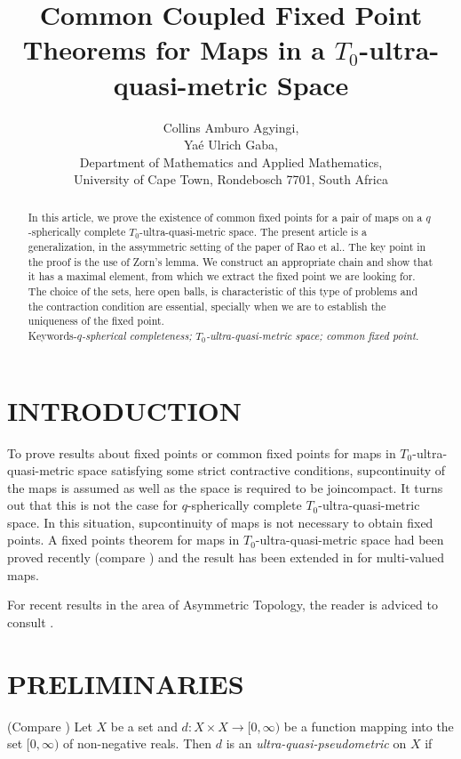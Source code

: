 \documentclass[10pt,a4paper]{article}
\title{Common Coupled Fixed Point Theorems for Maps in a $T_0$-ultra-quasi-metric Space}
\author{  Collins Amburo Agyingi,  \\ Ya\'e Ulrich Gaba,  \\ Department of Mathematics and Applied Mathematics,\\
University of Cape Town, Rondebosch 7701, South Africa}
\begin{document}
\maketitle


\begin{abstract}
In this article, we prove the existence of common fixed points for a pair of maps on a $q$-spherically complete $T_0$-ultra-quasi-metric space. The present article is a generalization, in the assymmetric setting of the paper of Rao et al.\cite{Rao}. The key point in the proof is the use of Zorn's lemma. We construct an appropriate chain and show that it has a maximal element, from which we extract the fixed point we are looking for. The choice of the sets, here open balls, is characteristic of this type of problems and the contraction condition are essential, specially when we are to establish the uniqueness of the fixed point. \\
Keywords-\textit{$q$-spherical completeness; $T_0$-ultra-quasi-metric space; common fixed point.}
\end{abstract}


\section{\textsc{INTRODUCTION}}
To prove results about fixed points or common fixed points for maps in $T_0$-ultra-quasi-metric space satisfying some strict contractive conditions, supcontinuity of the maps is assumed as well as the space is required to be joincompact. It turns out that this is not the case for $q$-spherically complete $T_0$-ultra-quasi-metric space. In this situation, supcontinuity of maps is not necessary to obtain fixed points. A fixed points theorem for maps in $T_0$-ultra-quasi-metric space had been proved recently (compare \cite{Agyingifixed}) and the result has been extended in \cite{Agyingiproximity} for multi-valued maps.

For recent results in the area of Asymmetric Topology, the reader is adviced to consult \cite{Agyingitight, Agyingiendpoint2}.

\section{\textsc{PRELIMINARIES}}
 (Compare \cite[page 2]{KunziOlela}) Let $X$ be a set and $d:X\times X \rightarrow [0,\infty)$ be a function mapping into the set $[0,\infty)$ of non-negative reals. Then $d$ is an {\em ultra-quasi-pseudometric} on $X$ if 
\end{document}
